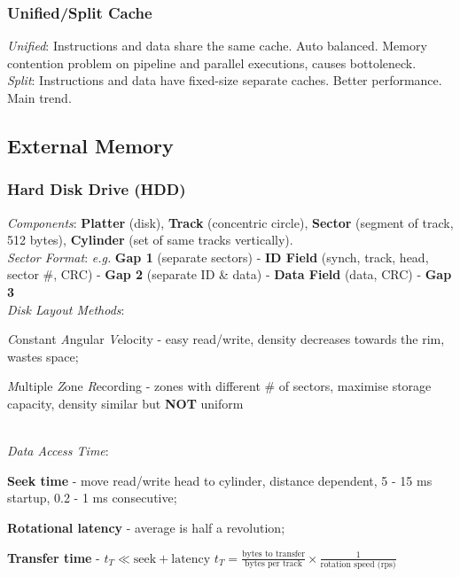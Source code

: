 \subsubsection*{Unified/Split Cache}
\emph{Unified}: Instructions and data share the same cache. Auto balanced. Memory contention problem on pipeline and parallel executions, causes bottoleneck.\\
\emph{Split}: Instructions and data have fixed-size separate caches. Better performance. Main trend.

\subsection*{External Memory}

\subsubsection*{Hard Disk Drive (HDD)}

\emph{Components}: \textbf{Platter} (disk), \textbf{Track} (concentric circle), \textbf{Sector} (segment of track, 512 bytes), \textbf{Cylinder} (set of same tracks vertically).\\
\emph{Sector Format}: {\footnotesize\itshape e.g.}
\textbf{Gap 1} (separate sectors) -
\textbf{ID Field} (synch, track, head, sector \#, CRC) -
\textbf{Gap 2} (separate ID \& data) -
\textbf{Data Field} (data, CRC) -
\textbf{Gap 3}\\
\emph{Disk Layout Methods}: \begin{enuminline}
\item \emph{C}onstant \emph{A}ngular \emph{V}elocity -
easy read/write, density decreases towards the rim, wastes space;
\item \emph{M}ultiple \emph{Z}one \emph{R}ecording -
zones with different \# of sectors, maximise storage capacity, density similar but \textbf{NOT} uniform
\end{enuminline}\\
\emph{Data Access Time}: \begin{enuminline}
\item \textbf{Seek time} - move read/write head to cylinder, distance dependent, 5 - 15 ms startup, 0.2 - 1 ms consecutive;
\item \textbf{Rotational latency} - average is half a revolution;
\item \textbf{Transfer time} - $t_T\ll \text{seek}+\text{latency}$
$t_T = \frac{\text{bytes to transfer}}{\text{bytes per track}} \times \frac{1}{\text{rotation speed (rps)}}$
\end{enuminline}

